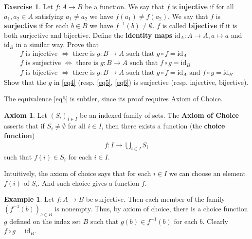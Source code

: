 \documentclass[12pt,b5paper,notitlepage]{article}
\theoremstyle{definition}
\newtheorem{eg}[df]{Example}
\newtheorem{exe}[df]{Exercise}
\newtheorem*{axiom}{Axiom}
\theoremstyle{plain}
\newcommand{\id}{\mathrm{id}}
\numberwithin{equation}{section}
\begin{document}
\begin{exe}\label{lb5}
Let $f:A\rightarrow B$ be a function. We say that $f$ is \textbf{injective} if for all $a_1,a_2\in A$ satisfying $a_1\neq a_2$ we have $f(a_1)\neq f(a_2)$. We say that $f$ is \textbf{surjective} if for each $b\in B$ we have $f^{-1}(b)\neq\emptyset$. $f$ is called \textbf{bijective} if it is both surjective and bijective. Define the \textbf{identity maps} $\id_A:A\rightarrow A,a\mapsto a$ \index{id@$\id_A$} and $\id_B$ in a similar way. Prove that
\begin{subequations}
\begin{gather}
\text{$f$ is injective $\Longleftrightarrow$ there is $g:B\rightarrow A$ such that $g\circ f=\id_A$}\label{eq4}\\
\text{$f$ is surjective $\Longleftrightarrow$ there is $g:B\rightarrow A$ such that $f\circ g=\id_B$}\label{eq5}\\
\text{$f$ is bijective $\Longleftrightarrow$ there is $g:B\rightarrow A$ such that $g\circ f=\id_A$ and $f\circ g=\id_B$}\label{eq6}
\end{gather}
\end{subequations}
Show that the $g$ in \eqref{eq4} (resp. \eqref{eq5}, \eqref{eq6}) is surjective (resp. injective, bijective).
\end{exe}


The equivalence \eqref{eq5} is subtler, since its proof requires Axiom of Choice.


\begin{axiom}
Let $(S_i)_{i\in I}$ be an indexed family of sets. The \textbf{Axiom of Choice} asserts that if $S_i\neq\emptyset$ for all $i\in I$, then there exists a function (the \textbf{choice function})
\begin{align*}
f:I\rightarrow \bigcup_{i\in I}S_i
\end{align*}
such that $f(i)\in S_i$ for each $i\in I$.
\end{axiom}


Intuitively, the axiom of choice says that for each $i\in I$ we can choose an element $f(i)$ of $S_i$. And such choice gives a function $f$.


\begin{eg}
Let $f:A\rightarrow B$ be surjective. Then each member of the family $(f^{-1}(b))_{b\in B}$ is nonempty. Thus, by axiom of choice, there is a choice function $g$ defined on the index set $B$ such that $g(b)\in f^{-1}(b)$ for each $b$. Clearly $f\circ g=\id_B$.
\end{eg}
\end{document}
